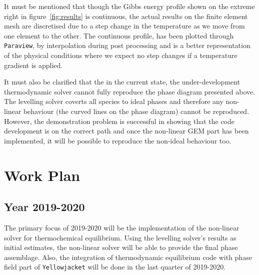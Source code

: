     It must be mentioned that though the Gibbs energy profile shown on the extreme right in figure~\ref{fig:results} is continuous, the actual results on the finite element mesh are discretised due to a step change in the temperature as we move from one element to the other. The continuous profile, has been plotted through \texttt{Paraview}, by interpolation during post processing and is a better representation of the physical conditions where we expect no step changes if a temperature gradient is applied.
    
    It must also be clarified that the in the current state, the under-development thermodynamic solver cannot fully reproduce the phase diagram presented above. The levelling solver coverts all species to ideal phases and therefore any non-linear behaviour (the curved lines on the phase diagram) cannot be reproduced. However, the demonstration problem is successful in showing that the code development is on the correct path and once the non-linear GEM part has been implemented, it will be possible to reproduce the non-ideal behaviour too. 
	
\section{Work Plan} \label{sec:workplan}
	\subsection{Year 2019-2020}
	The primary focus of 2019-2020 will be the implementation of the non-linear solver for thermochemical equilibrium. Using the levelling solver's results as  initial estimates, the non-linear solver will be able to provide the final phase assemblage. Also, the integration of thermodynamic equilibrium code with phase field part of \texttt{Yellowjacket} will be done in the last quarter of 2019-2020.
